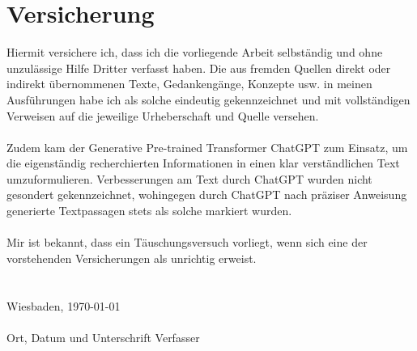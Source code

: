 \chapter*{Versicherung}
Hiermit versichere ich, dass ich die vorliegende Arbeit selbständig und ohne unzulässige Hilfe Dritter verfasst haben. Die aus fremden Quellen direkt oder indirekt übernommenen Texte, Gedankengänge, Konzepte usw. in meinen Ausführungen habe ich als solche eindeutig gekennzeichnet und mit vollständigen Verweisen auf die jeweilige Urheberschaft und Quelle versehen.\\ \\ 
Zudem kam der Generative Pre-trained Transformer ChatGPT zum Einsatz, um die eigenständig recherchierten Informationen in einen klar verständlichen Text umzuformulieren. Verbesserungen am Text durch ChatGPT wurden nicht gesondert gekennzeichnet, wohingegen durch ChatGPT nach präziser Anweisung generierte Textpassagen stets als solche markiert wurden.\\ \\
Mir ist bekannt, dass ein Täuschungsversuch vorliegt, wenn sich eine der vorstehenden Versicherungen als unrichtig erweist.\\ \\
\\
Wiesbaden, {\today} 
\\ 
\\
Ort, Datum und Unterschrift Verfasser
\newpage

